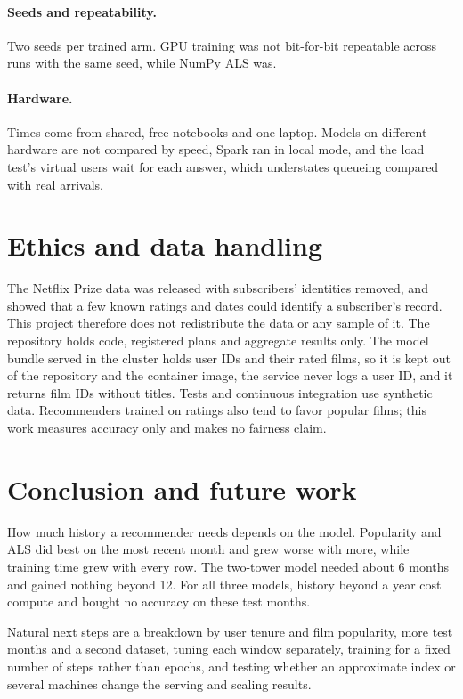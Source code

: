 \documentclass[11pt]{article}
\begin{document}
\paragraph{Seeds and repeatability.} Two seeds per trained arm. GPU training was not bit-for-bit
repeatable across runs with the same seed, while NumPy ALS was.
\paragraph{Hardware.} Times come from shared, free notebooks and one laptop. Models on different
hardware are not compared by speed, Spark ran in local mode, and the load test's virtual users
wait for each answer, which understates queueing compared with real arrivals.

\section{Ethics and data handling}
\label{sec:ethics}

The Netflix Prize data was released with subscribers' identities removed, and \citet{narayanan2008deanon} showed that a
few known ratings and dates could identify a subscriber's record. This project therefore does not
redistribute the data or any sample of it. The repository holds code, registered plans and
aggregate results only. The model bundle served in the cluster holds user IDs and their rated
films, so it is kept out of the repository and the container image, the service never logs a
user ID, and it returns film IDs without titles. Tests and continuous integration use synthetic
data. Recommenders trained on ratings also tend to favor popular films; this work measures
accuracy only and makes no fairness claim.

\section{Conclusion and future work}

How much history a recommender needs depends on the model. Popularity and ALS did best on the
most recent month and grew worse with more, while training time grew with every row. The
two-tower model needed about 6 months and gained nothing beyond 12. For all three models, history
beyond a year cost compute and bought no accuracy on these test months.

Natural next steps are a breakdown by user tenure and film popularity, more test months and a
second dataset, tuning each window separately, training for a fixed number of steps rather than
epochs, and testing whether an approximate index or several machines change the serving and
scaling results.
\end{document}
